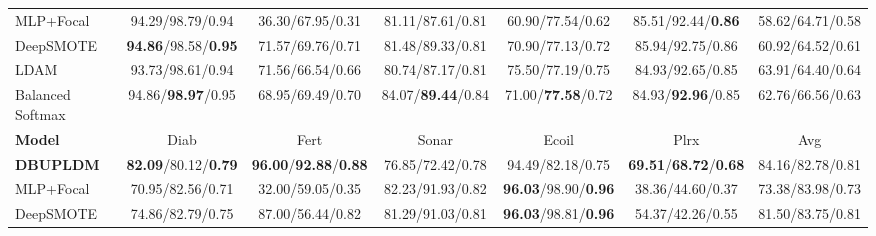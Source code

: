 \documentclass[journal,12pt, onecolumn]{IEEEtran}
\begin{document}
{\begin{table}[htbp]
{\begin{tabular}{lcccccc}
    MLP+Focal        & {\color{red}94.29}/{\color{red}98.79}/{\color{red}0.94} & {\color{red}36.30}/{\color{red}67.95}/{\color{red}0.31} & {\color{red}81.11}/{\color{red}87.61}/{\color{red}0.81} & {\color{red}60.90}/{\color{red}77.54}/{\color{red}0.62} & {\color{red}85.51}/{\color{red}92.44}/\textbf{\color{red}0.86} & {\color{red}58.62}/{\color{red}64.71}/{\color{red}0.58} \\
    DeepSMOTE        & \textbf{\color{red}94.86}/{\color{red}98.58}/\textbf{\color{red}0.95} & {\color{red}71.57}/{\color{red}69.76}/{\color{red}0.71} & {\color{red}81.48}/{\color{red}89.33}/{\color{red}0.81} & {\color{red}70.90}/{\color{red}77.13}/{\color{red}0.72} & {\color{red}85.94}/{\color{red}92.75}/{\color{red}0.86} & {\color{red}60.92}/{\color{red}64.52}/{\color{red}0.61} \\
    LDAM             & {\color{red}93.73}/{\color{red}98.61}/{\color{red}0.94} & {\color{red}71.56}/{\color{red}66.54}/{\color{red}0.66} & {\color{red}80.74}/{\color{red}87.17}/{\color{red}0.81} & {\color{red}75.50}/{\color{red}77.19}/{\color{red}0.75} & {\color{red}84.93}/{\color{red}92.65}/{\color{red}0.85} & {\color{red}63.91}/{\color{red}64.40}/{\color{red}0.64} \\
    Balanced Softmax & {\color{red}94.86}/\textbf{\color{red}98.97}/{\color{red}0.95} & {\color{red}68.95}/{\color{red}69.49}/{\color{red}0.70} & {\color{red}84.07}/\textbf{\color{red}89.44}/{\color{red}0.84} & {\color{red}71.00}/\textbf{\color{red}77.58}/{\color{red}0.72} & {\color{red}84.93}/\textbf{\color{red}92.96}/{\color{red}0.85} & {\color{red}62.76}/{\color{red}66.56}/{\color{red}0.63} \\
    \midrule
    \textbf{Model} & Diab & Fert & Sonar & Ecoil & Plrx & Avg \\
    \midrule
    \textbf{DBUPLDM} & \textbf{82.09}/80.12/\textbf{0.79} & \textbf{96.00}/\textbf{92.88}/\textbf{0.88} & 76.85/72.42/0.78 & 94.49/82.18/0.75 & \textbf{69.51}/\textbf{68.72}/\textbf{0.68} & 84.16/82.78/0.81 \\
    MLP+Focal        & {\color{red}70.95}/{\color{red}82.56}/{\color{red}0.71} & {\color{red}32.00}/{\color{red}59.05}/{\color{red}0.35} & {\color{red}82.23}/{\color{red}91.93}/{\color{red}0.82} & \textbf{\color{red}96.03}/{\color{red}98.90}/\textbf{\color{red}0.96} & {\color{red}38.36}/{\color{red}44.60}/{\color{red}0.37} & {\color{red}73.38}/{\color{red}83.98}/{\color{red}0.73} \\
    DeepSMOTE        & {\color{red}74.86}/{\color{red}82.79}/{\color{red}0.75} & {\color{red}87.00}/{\color{red}56.44}/{\color{red}0.82} & {\color{red}81.29}/{\color{red}91.03}/{\color{red}0.81} & \textbf{\color{red}96.03}/{\color{red}98.81}/\textbf{\color{red}0.96} & {\color{red}54.37}/{\color{red}42.26}/{\color{red}0.55} & {\color{red}81.50}/{\color{red}83.75}/{\color{red}0.81} \\

\end{tabular}}
\end{table}}
\end{document}
